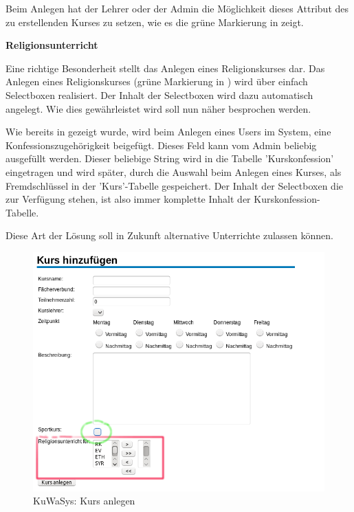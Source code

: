 \documentclass[12pt, twoside, a4paper, ngerman]{article}
\begin{document}
Beim Anlegen hat der Lehrer oder der Admin die Möglichkeit dieses Attribut des zu erstellenden Kurses zu setzen, wie es die grüne Markierung in  zeigt.


\textbf{Religionsunterricht}

Eine richtige Besonderheit stellt das Anlegen eines Religionskurses dar.
Das Anlegen eines Religionskurses (grüne Markierung in ) wird über einfach Selectboxen realisiert. Der Inhalt der Selectboxen wird dazu automatisch angelegt. Wie dies gewährleistet wird soll nun näher besprochen werden.

Wie bereits in  gezeigt wurde, wird beim Anlegen eines Users im System, eine Konfessionszugehörigkeit beigefügt. Dieses Feld kann vom Admin beliebig ausgefüllt werden. 
Dieser beliebige String wird in die Tabelle 'Kurskonfession' eingetragen und wird später, durch die Auswahl beim Anlegen eines Kurses, als Fremdschlüssel in der 'Kurs'-Tabelle gespeichert.
Der Inhalt der Selectboxen die zur Verfügung stehen, ist also immer komplette Inhalt der Kurskonfession-Tabelle.




Diese Art der Lösung soll in Zukunft alternative Unterrichte zulassen können.

\begin{figure}[H]
 \begin{center}
   \includegraphics[scale=0.6]{img/KursAnlegen_KuWaSys.png}
 \end{center}
 \caption[\textbf{KuWaSys: Kurs anlegen}]{KuWaSys: Kurs anlegen}
 \label{fig:KursAnlegen_KuWaSys}
\end{figure}
\end{document}
